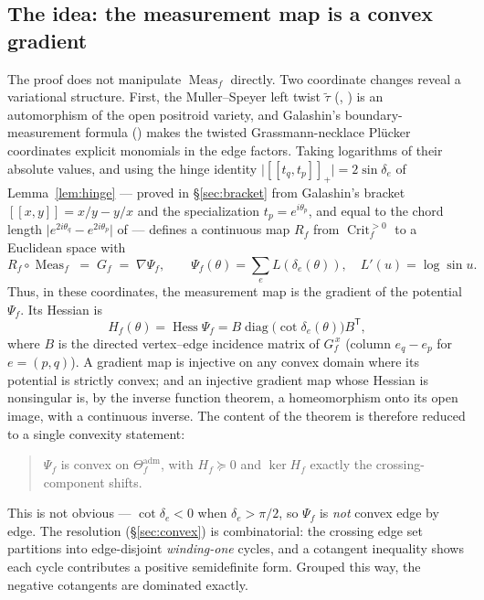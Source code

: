 \documentclass[11pt]{article}
\theoremstyle{definition}
\DeclareMathOperator{\Meas}{Meas}
\DeclareMathOperator{\Crit}{Crit}
\DeclareMathOperator{\Hess}{Hess}
\newcommand{\Theadm}{\Theta_f^{\mathrm{adm}}}
\newcommand{\Critf}{\Crit_f^{>0}}
\begin{document}
\subsection*{The idea: the measurement map is a convex gradient}
The proof does not manipulate $\Meas_f$ directly. Two coordinate changes reveal a variational structure.
First, the Muller--Speyer left twist $\widetilde\tau$ (\cite[\S5.4]{Galashin}, \cite{MullerSpeyer}) is an
automorphism of the open positroid variety, and Galashin's boundary-measurement formula
(\cite[Prop.~5.12]{Galashin}) makes the twisted Grassmann-necklace Pl\"ucker coordinates explicit monomials
in the edge factors. Taking logarithms of their absolute values, and using the hinge identity
$\lvert[\![t_q,t_p]\!]_+\rvert=2\sin\delta_e$ of Lemma~\ref{lem:hinge} --- proved in \S\ref{sec:bracket}
from Galashin's bracket $[\![x,y]\!]=x/y-y/x$ and the specialization $t_p=e^{i\theta_p}$, and equal to the
chord length $\lvert e^{2i\theta_q}-e^{2i\theta_p}\rvert$ of \cite[Rem.~1.2]{Galashin} --- defines a
continuous map $R_f$ from $\Critf$ to a Euclidean space with
\begin{equation}\label{eq:gradient}
   R_f\circ\Meas_f \;=\; G_f \;=\; \nabla\Psi_f, \qquad
   \Psi_f(\theta)=\sum_{e}L(\delta_e(\theta)),\quad L'(u)=\log\sin u.
\end{equation}
Thus, in these coordinates, the measurement map is the gradient of the potential $\Psi_f$. Its Hessian is
\begin{equation}\label{eq:hessian}
   H_f(\theta)=\Hess\Psi_f = B\operatorname{diag}\bigl(\cot\delta_e(\theta)\bigr)B^{\mathsf T},
\end{equation}
where $B$ is the directed vertex--edge incidence matrix of $G_f^{\,x}$ (column $e_q-e_p$ for $e=(p,q)$).
A gradient map is injective on any convex domain where its potential is strictly convex; and an injective
gradient map whose Hessian is nonsingular is, by the inverse function theorem, a homeomorphism onto its
open image, with a continuous inverse. The
content of the theorem is therefore reduced to a single convexity statement:

\begin{quote}
$\Psi_f$ is convex on $\Theadm$, with $H_f\succeq0$ and $\ker H_f$ exactly the crossing-component shifts.
\end{quote}

This is not obvious --- $\cot\delta_e<0$ when $\delta_e>\pi/2$, so $\Psi_f$ is \emph{not} convex edge by
edge. The resolution (\S\ref{sec:convex}) is combinatorial: the crossing edge set partitions into
edge-disjoint \emph{winding-one} cycles, and a cotangent inequality shows each cycle contributes a positive
semidefinite form. Grouped this way, the negative cotangents are dominated exactly.
\end{document}
